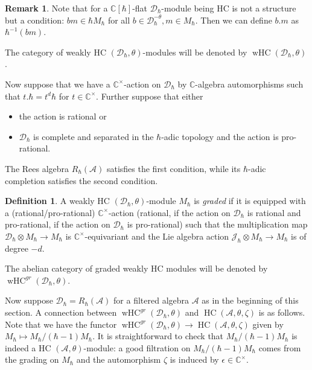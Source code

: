 \documentclass[12pt]{amsart}
\newcommand{\C}{\mathbb{C}}
\newcommand{\A}{\mathcal{A}}
\newcommand{\J}{\mathcal{J}}
\newcommand{\HC}{\operatorname{HC}}
\newcommand{\wHC}{\operatorname{wHC}}
\newcommand{\Dcal}{\mathcal{D}}
\theoremstyle{definition}
\newtheorem{defi}[Thm]{Definition}
\newtheorem{Rem}[Thm]{Remark}
\numberwithin{equation}{section}
\begin{document}
\begin{Rem}\label{Rem:flat_wHC}
Note that for a $\C[\hbar]$-flat $\Dcal_\hbar$-module being HC is not a structure but a condition:
$bm\in \hbar M_\hbar$ for all $b\in \Dcal_{\hbar}^{-\theta},m\in M_\hbar$. Then we can define
$b.m$ as $\hbar^{-1}(bm)$.
\end{Rem}

The category of weakly HC $(\Dcal_\hbar, \theta)$-modules will be denoted by $\wHC(\Dcal_\hbar,\theta)$.

Now suppose that we have a $\C^\times$-action on $\Dcal_\hbar$ by $\C$-algebra automorphisms
such that $t.\hbar=t^d\hbar$ for $t \in \C^\times$. Further suppose that either
\begin{itemize}\item the action is rational or
\item $\Dcal_\hbar$
is complete and separated in the $\hbar$-adic topology and the action is pro-rational.
\end{itemize}
The Rees algebra $R_\hbar(\A)$ satisfies the first condition, while its $\hbar$-adic completion
satisfies the second condition.

\begin{defi}\label{defi:wHC_graded}
A weakly HC $(\Dcal_\hbar,\theta)$-module $M_\hbar$ is {\it graded} if it is equipped with
a (rational/pro-rational) $\C^\times$-action (rational, if the action on $\Dcal_\hbar$ is rational
and pro-rational, if the action on $\Dcal_\hbar$ is pro-rational) such that
the multiplication map $\Dcal_\hbar\otimes M_\hbar\rightarrow M_\hbar$ is
$\C^\times$-equivariant and the Lie algebra action $\J_\hbar
\otimes M_\hbar\rightarrow M_\hbar$ is of degree $-d$.
\end{defi}

The abelian category of graded weakly HC modules will be denoted by $\wHC^{gr}(\Dcal_\hbar,\theta)$.

Now suppose $\Dcal_\hbar=R_\hbar(\A)$ for a filtered algebra $\A$ as in the beginning of this
section.
A connection between $\wHC^{gr}(\Dcal_\hbar,\theta)$ and $\HC(\A,\theta,\zeta)$ is as follows.
Note that we have the functor $\wHC^{gr}(\Dcal_\hbar,\theta)\rightarrow \HC(\A,\theta,\zeta)$
given by $M_\hbar\mapsto M_\hbar/(\hbar-1)M_\hbar$. It is straightforward to check that $M_\hbar/(\hbar-1) M_\hbar$
is indeed a HC $(\A,\theta)$-module: a good filtration on $M_\hbar/(\hbar-1) M_\hbar$
comes from the grading on $M_\hbar$ and the automorphism $\zeta$ is induced by $\epsilon\in \C^\times$.
\end{document}
